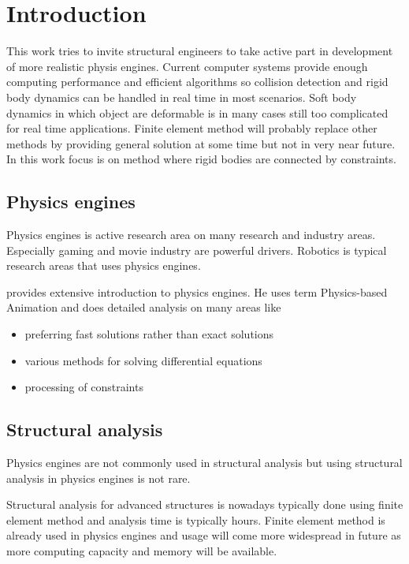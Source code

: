 \section{Introduction}

This work tries to invite structural engineers to take active part in development of more realistic physis engines.
Current computer systems provide enough computing performance and efficient algorithms so collision detection and 
rigid body dynamics can be handled in real time in most scenarios.
Soft body dynamics in which  object are deformable is in many cases still too complicated for real time applications.
Finite element method will probably replace other methods by providing general solution at some time but not in very near future.
In this work focus is on method where rigid bodies are connected by constraints.

 

\subsection{Physics engines}

Physics engines is active research area on many research and industry areas.
Especially gaming and movie industry are powerful drivers.
Robotics is typical research areas that uses physics engines.

\cite{erleben.thesis} provides extensive introduction to physics engines. 
He uses term Physics-based Animation and does detailed analysis on many areas like
\begin{itemize}
\item preferring fast solutions rather than exact solutions
\item various methods for solving differential equations
\item processing of constraints
\end{itemize}

\cite{cornell.cs3152}

\subsection{Structural analysis}

Physics engines are not commonly used in structural analysis but using structural analysis in physics engines is not rare.  

Structural analysis for advanced structures is nowadays typically done using finite element method and 
analysis time is typically hours. Finite element method is already used in physics engines and usage will come 
more widespread in future as more computing capacity and memory will be available.

